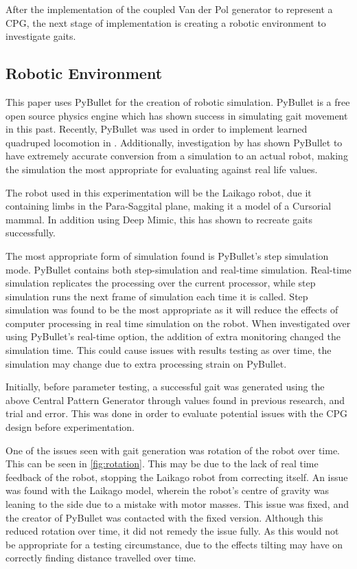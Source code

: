 After the implementation of the coupled Van der Pol generator to represent a CPG, the next stage of implementation is creating a robotic environment to investigate gaits.

\subsection{Robotic Environment}
This paper uses PyBullet for the creation of robotic simulation. PyBullet is a free open source physics engine which has shown success in simulating gait movement in this past. Recently, PyBullet was used in order to implement learned quadruped locomotion in \cite{Singla2018}. Additionally, investigation by \cite{Collins2018} has shown PyBullet to have extremely accurate conversion from a simulation to an actual robot, making the simulation the most appropriate for evaluating against real life values.

The robot used in this experimentation will be the Laikago robot, due it containing limbs in the Para-Saggital plane, making it a model of a Cursorial mammal. In addition using Deep Mimic, this has shown to recreate gaits successfully. 

The most appropriate form of simulation found is PyBullet's step simulation mode. PyBullet contains both step-simulation and real-time simulation. Real-time simulation replicates the processing over the current processor, while step simulation runs the next frame of simulation each time it is called. Step simulation was found to be the most appropriate as it will reduce the effects of computer processing in real time simulation on the robot. When investigated over using PyBullet's real-time option, the addition of extra monitoring changed the simulation time. This could cause issues with results testing as over time, the simulation may change due to extra processing strain on PyBullet.



Initially, before parameter testing, a successful gait was generated using the above Central Pattern Generator through values found in previous research, and trial and error. This was done in order to evaluate potential issues with the CPG design before experimentation. 

One of the issues seen with gait generation was rotation of the robot over time. This can be seen in \ref{fig:rotation}. This may be due to the lack of real time feedback of the robot, stopping the Laikago robot from correcting itself. An issue was found with the Laikago model, wherein the robot's centre of gravity was leaning to the side due to a mistake with motor masses. This issue was fixed, and the creator of PyBullet was contacted with the fixed version. Although this reduced rotation over time, it did not remedy the issue fully. As this would not be appropriate for a testing circumstance, due to the effects tilting may have on correctly finding distance travelled over time.

